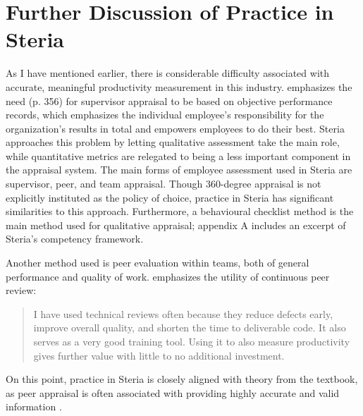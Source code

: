 \documentclass[letterpaper, 12pt]{report}
\begin{document}



\section{Further Discussion of Practice in Steria}

As I have mentioned earlier, there is considerable difficulty associated with accurate, meaningful productivity measurement in this industry.
\textcite{textbook} emphasizes the need (p. 356) for supervisor appraisal to be based on objective performance records, which emphasizes the individual employee's responsibility for the organization's results in total and empowers employees to do their best.
Steria approaches this problem by letting qualitative assessment take the main role, while quantitative metrics are relegated to being a less important component in the appraisal system. 
The main forms of employee assessment used in Steria are supervisor, peer, and team appraisal. 
Though 360-degree appraisal is not explicitly instituted as the policy of choice, practice in Steria has significant similarities to this approach.
Furthermore, a behavioural checklist method \parencite[][371]{textbook} is the main method used for qualitative appraisal; appendix A includes an excerpt of Steria's competency framework. 

Another method used is peer evaluation within teams, both of general performance and quality of work.
\textcite{angel:howto} emphasizes the utility of continuous peer review:
\begin{quote}
	I have used technical reviews often because they reduce defects early, improve overall quality, and shorten the time to deliverable code. It also serves as a very good training tool. Using it to also measure productivity gives further value with little to no additional investment.
\end{quote}
On this point, practice in Steria is closely aligned with theory from the textbook, as peer appraisal is often associated with providing highly accurate and valid information \parencite[][357]{textbook}.
\end{document}
